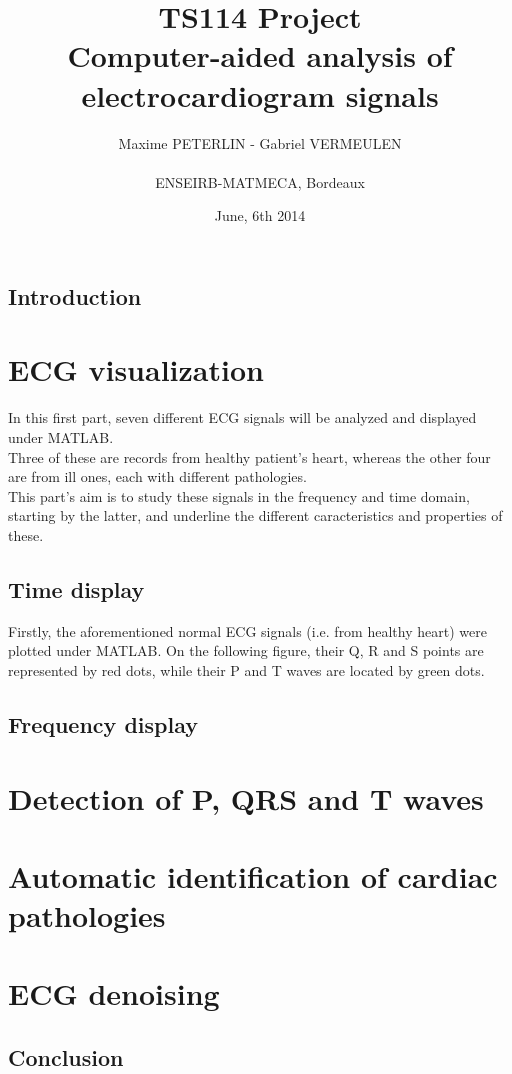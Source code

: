 \documentclass[11pt]{report}
\title{\textbf{TS114 Project}\\Computer-aided analysis of electrocardiogram signals}
\author{{Maxime PETERLIN - Gabriel VERMEULEN }\\\\{ENSEIRB-MATMECA, Bordeaux}}
\date{June, 6th 2014}
\begin{document}
\maketitle

\tableofcontents

\newpage
\section*{Introduction}


\chapter{ECG visualization}
	In this first part, seven different ECG signals will be analyzed and displayed under MATLAB. \\Three of these are records from healthy patient's heart, whereas the other four are from ill ones, each with different pathologies.\\
	This part's aim is to study these signals in the frequency and time domain, starting by the latter, and underline the different caracteristics and properties of these.

	\section{Time display}
		Firstly, the aforementioned normal ECG signals (i.e. from healthy heart) were plotted under MATLAB. On the following figure, their Q, R and S points are represented by red dots, while their P and T waves are located by green dots.  

	\section{Frequency display}


\chapter{Detection of P, QRS and T waves}

\chapter{Automatic identification of cardiac pathologies}

\chapter{ECG denoising}


\newpage
\section*{Conclusion}
\end{document}
